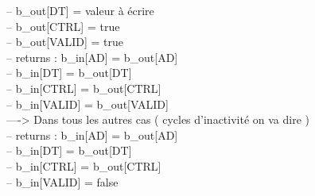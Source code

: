 \documentclass{article}
\begin{document}
--               b\_out[DT]    = valeur à écrire\\ 
--               b\_out[CTRL]  = true\\
--               b\_out[VALID] = true\\
--    returns  : b\_in[AD]    = b\_out[AD]\\
--               b\_in[DT]    = b\_out[DT]\\
--               b\_in[CTRL]  = b\_out[CTRL]\\
--               b\_in[VALID] = b\_out[VALID]\\
----> Dans tous les autres cas ( cycles d'inactivité on va dire )\\
--    returns  : b\_in[AD]    = b\_out[AD]\\
--               b\_in[DT]    = b\_out[DT]\\
--               b\_in[CTRL]  = b\_out[CTRL]\\
--               b\_in[VALID] = false
\end{document}
